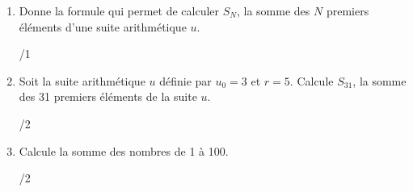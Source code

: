 	\begin{enumerate}
		\item 
			\begin{minipage}[t]{.9\textwidth}
				Donne la formule qui permet de calculer $S_N$, la somme des $N$ premiers éléments d'une suite arithmétique $u$.
			\end{minipage}%
			\begin{minipage}{.1\textwidth}
				\begin{flushright}
					{\large /1}
				\end{flushright}
			\end{minipage}
			\vspace{3em}
			
		\item 
			\begin{minipage}[t]{.9\textwidth}
				Soit la suite arithmétique $u$ définie par $u_0 = 3$ et $r = 5$. Calcule $S_{31}$, la somme des 31 premiers éléments de la suite $u$.
			\end{minipage}%
			\begin{minipage}{.1\textwidth}
				\begin{flushright}
					{\large /2}
				\end{flushright}
			\end{minipage}
			\vspace{3em}
			
		\item 
			\begin{minipage}[t]{.9\textwidth}
				Calcule la somme des nombres de 1 à 100.
			\end{minipage}%
			\begin{minipage}{.1\textwidth}
				\begin{flushright}
					{\large /2}
				\end{flushright}
			\end{minipage}
			\vspace{3em}

	\end{enumerate}
	
